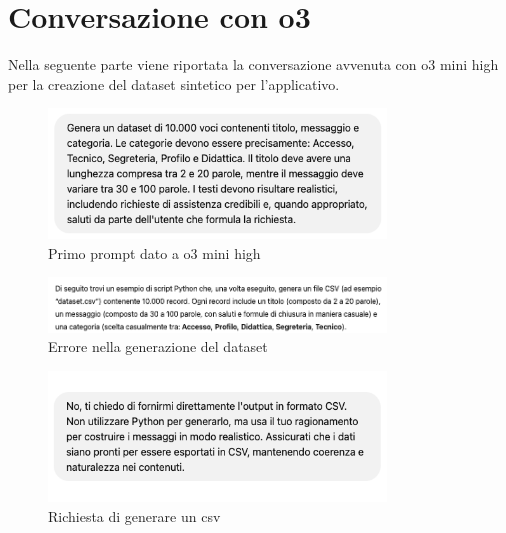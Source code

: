 \section{Conversazione con o3}
Nella seguente parte viene riportata la conversazione avvenuta con o3 mini high per la creazione del dataset sintetico per l'applicativo.
\begin{figure}[H]
    \centering
    \includegraphics[width=0.8\textwidth]{images/firstPrompt.png}
    \caption{Primo prompt dato a o3 mini high}
    \label{fig:firstPrompt}
\end{figure}
\begin{figure}[H]
    \centering
    \includegraphics[width=0.8\textwidth]{images/pythonError.png}
    \caption{Errore nella generazione del dataset}
    \label{fig:pythonError}
\end{figure}
\begin{figure}[H]
    \centering
    \includegraphics[width=0.8\textwidth]{images/csvPrompt.png}
    \caption{Richiesta di generare un csv}
    \label{fig:csvPrompt}
\end{figure}
